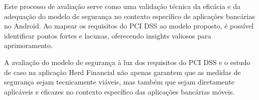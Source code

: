     Este processo de avaliação serve como uma validação técnica da eficácia e da adequação do modelo de segurança no contexto específico de aplicações bancárias no Android. Ao mapear os requisitos do PCI DSS ao modelo proposto, é possível identificar pontos fortes e lacunas, oferecendo insights valiosos para aprimoramento. 
    
    A avaliação do modelo de segurança à luz dos requisitos do PCI DSS e o estudo de caso na aplicação Herd Financial não apenas garantem que as medidas de segurança sejam tecnicamente viáveis, mas também que sejam diretamente aplicáveis e eficazes no contexto específico das aplicações bancárias móveis.
    